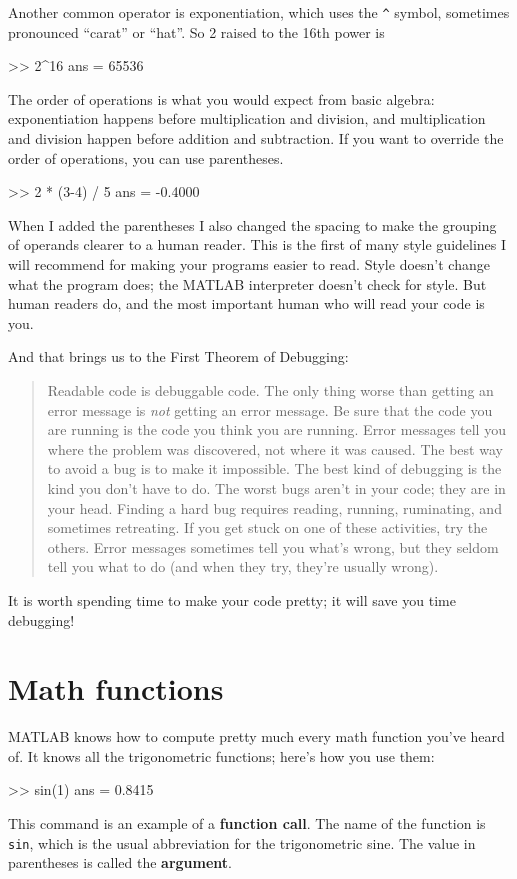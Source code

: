\documentclass[
]{book}
\numberwithin{Answer}{chapter}
\numberwithin{Exercise}{chapter}
\newcommand{\displaythrm}[1]{%
    \ifthenelse{\equal{#1}{1}}%
        {Readable code is debuggable code.}{%
    \ifthenelse{\equal{#1}{2}}%
        {The only thing worse than getting an error message is {\em
         not} getting an error message.}{%
    \ifthenelse{\equal{#1}{3}}%
        {Be sure that the code you are running
         is the code you think you are running.}{%
    \ifthenelse{\equal{#1}{4}}%
        {Error messages tell you where the problem was discovered,
         not where it was caused.}{%
    \ifthenelse{\equal{#1}{5}}%
        {The best way to avoid a bug is to make it impossible.}{%
    \ifthenelse{\equal{#1}{6}}%
        {The best kind of debugging is the kind you don't have to do.}{%
    \ifthenelse{\equal{#1}{7}}%
        {The worst bugs aren't in your code; they are in your head.}{%
    \ifthenelse{\equal{#1}{8}}%
        {Finding a hard bug requires reading, running, ruminating,
         and sometimes retreating.  If you get stuck on one of these
         activities, try the others.}{%
    \ifthenelse{\equal{#1}{9}}%
        {Error messages sometimes tell you what's wrong, but they
         seldom tell you what to do (and when they try, they're usually
         wrong).}{%
    {}%
}}}}}}}}}}%
\begin{document}
Another common operator is exponentiation, which uses the \verb+^+
symbol, sometimes pronounced ``carat'' or ``hat''.  So 2 raised to the
16th power is

\begin{code}
>> 2^16
ans = 65536
\end{code}

The order of operations is what you would expect from basic algebra:
exponentiation happens before multiplication and division, and multiplication and division happen before addition and subtraction.
If you want to override the order of operations, you can use parentheses.


\begin{code}
>> 2 * (3-4) / 5
ans = -0.4000
\end{code}

When I added the parentheses I also changed the spacing to make the
grouping of operands clearer to a human reader.  This is the first
of many style guidelines I will recommend for making your programs
easier to read.  Style doesn't change what the program does; the MATLAB
interpreter doesn't check for style.  But human readers do, and the
most important human who will read your code is you.


And that brings us to the First Theorem of Debugging:

\begin{quote}
\displaythrm{1}
\end{quote}

It is worth spending time to make your code pretty; it will save
you time debugging!


\section{Math functions}

MATLAB knows how to compute pretty much every math function you've
heard of.  It knows all the trigonometric functions; here's how you
use them:


\begin{code}
>> sin(1)
ans = 0.8415
\end{code}

This command is an example of a {\bf function call}.  The name of the
function is {\tt sin}, which is the usual abbreviation for the
trigonometric sine.  The value in parentheses is called the {\bf argument}.
\end{document}
